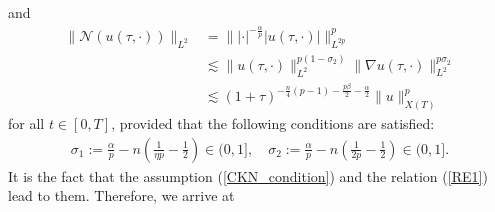 \documentclass[11pt,reqno]{amsart}
\begin{document}
    and
    \begin{align*}
        \|\mathcal{N}(u(\tau,\cdot))\|_{L^2} &= \| |\cdot|^{-\frac{\alpha}{p}} |u(\tau,\cdot)|\|_{L^{2p}}^p \\
        &\lesssim \|u(\tau,\cdot)\|_{L^2}^{p(1-\sigma_2)} \|\nabla u(\tau,\cdot)\|_{L^2}^{p\sigma_2}\\
        &\lesssim (1+\tau)^{-\frac{n}{4}(p-1)-\frac{p\beta}{2}-\frac{\alpha}{2}} \|u\|_{X(T)}^p
    \end{align*}
    for all $t \in [0,T]$,
   provided that the following conditions are satisfied: 
    \begin{align*}
        \sigma_1 := \frac{\alpha}{p}-n\left(\frac{1}{\eta p}-\frac{1}{2}\right) \in (0, 1], \quad \sigma_2:= \frac{\alpha}{p}- n\left(\frac{1}{2p}-\frac{1}{2}\right) \in (0,1].
    \end{align*}
   It is the fact that the assumption (\ref{CKN_condition}) and the relation (\ref{RE1}) lead to them. Therefore, we arrive at
\end{document}
